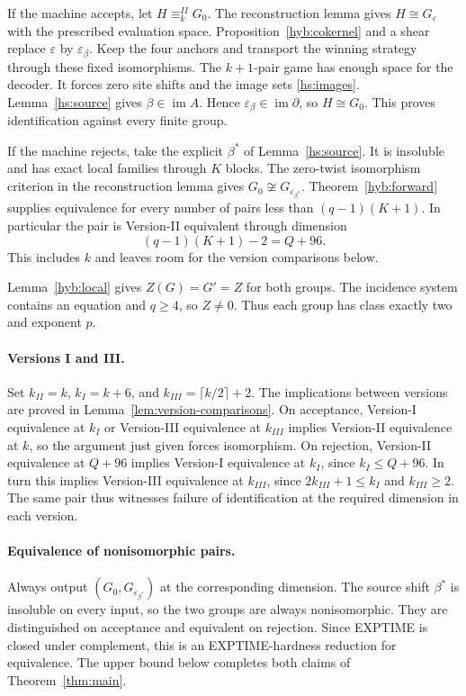 \documentclass[11pt]{article}
\newcommand{\eps}{\varepsilon}
\DeclareMathOperator{\im}{im}
\theoremstyle{definition}
\theoremstyle{remark}
\numberwithin{equation}{section}
\begin{document}
If the machine accepts, let $H\equiv_k^{II}G_0$. The reconstruction
lemma gives $H\cong G_\eps$ with the prescribed evaluation space.
Proposition~\ref{hyb:cokernel} and a shear replace $\eps$ by
$\eps_\beta$. Keep the four anchors and transport the winning strategy
through these fixed isomorphisms. The $k+1$-pair game has enough space
for the decoder. It forces zero site shifts and the image sets
\eqref{hs:images}. Lemma~\ref{hs:source} gives $\beta\in\im A$.
Hence $\eps_\beta\in\im\partial$, so $H\cong G_0$.
This proves identification against every finite group.

If the machine rejects, take the explicit $\beta^*$ of
Lemma~\ref{hs:source}. It is insoluble and has exact local families
through $K$ blocks. The zero-twist isomorphism criterion in the
reconstruction lemma gives $G_0\not\cong G_{\eps_{\beta^*}}$.
Theorem~\ref{hyb:forward} supplies equivalence for every number of pairs
less than $(q-1)(K+1)$. In particular the pair is Version-II equivalent
through dimension
\begin{equation}
 (q-1)(K+1)-2=Q+96.
 \label{eq:no-range}
\end{equation}
This includes $k$ and leaves room for the version comparisons below.

Lemma~\ref{hyb:local} gives $Z(G)=G'=Z$ for both groups.
The incidence system contains an equation and $q\ge4$, so $Z\ne0$.
Thus each group has class exactly two and exponent $p$.

\paragraph{Versions I and III.}
Set $k_{II}=k$, $k_I=k+6$, and $k_{III}=\lceil k/2\rceil+2$.
The implications between versions are proved in
Lemma~\ref{lem:version-comparisons}. On acceptance, Version-I
equivalence at $k_I$ or Version-III equivalence at $k_{III}$ implies
Version-II equivalence at $k$, so the argument just given forces
isomorphism. On rejection, Version-II equivalence at $Q+96$ implies
Version-I equivalence at $k_I$, since $k_I\le Q+96$.
In turn this implies Version-III equivalence at $k_{III}$, since
$2k_{III}+1\le k_I$ and $k_{III}\ge2$. The same pair thus witnesses
failure of identification at the required dimension in each version.

\paragraph{Equivalence of nonisomorphic pairs.}
Always output $(G_0,G_{\eps_{\beta^*}})$ at the corresponding dimension.
The source shift $\beta^*$ is insoluble on every input, so the two
groups are always nonisomorphic. They are distinguished on acceptance
and equivalent on rejection. Since EXPTIME is closed under complement,
this is an EXPTIME-hardness reduction for equivalence. The upper bound
below completes both claims of Theorem~\ref{thm:main}.
\end{document}
